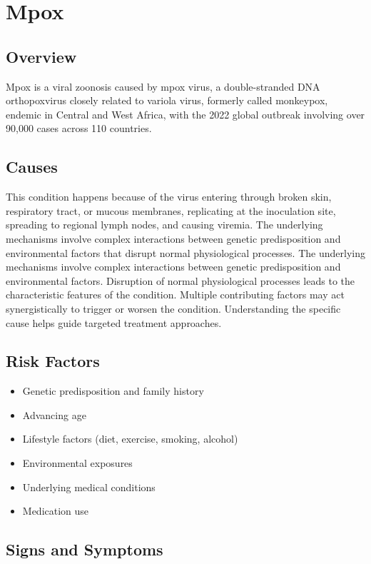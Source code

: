 \chapter{Mpox}
\label{sec:Mpox}

\section{Overview}
Mpox is a viral zoonosis caused by mpox virus, a double-stranded DNA orthopoxvirus closely related to variola virus, formerly called monkeypox, endemic in Central and West Africa, with the 2022 global outbreak involving over 90,000 cases across 110 countries.
\section{Causes}
This condition happens because of the virus entering through broken skin, respiratory tract, or mucous membranes, replicating at the inoculation site, spreading to regional lymph nodes, and causing viremia. The underlying mechanisms involve complex interactions between genetic predisposition and environmental factors that disrupt normal physiological processes. The underlying mechanisms involve complex interactions between genetic predisposition and environmental factors. Disruption of normal physiological processes leads to the characteristic features of the condition. Multiple contributing factors may act synergistically to trigger or worsen the condition. Understanding the specific cause helps guide targeted treatment approaches.
\section{Risk Factors}


\begin{itemize}[noitemsep]
  \item Genetic predisposition and family history
  \item Advancing age
  \item Lifestyle factors (diet, exercise, smoking, alcohol)
  \item Environmental exposures
  \item Underlying medical conditions
  \item Medication use
\end{itemize}
\section{Signs and Symptoms}

